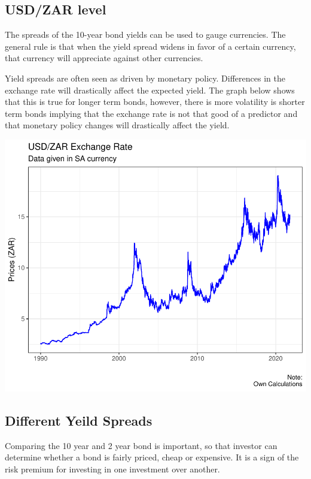 \documentclass[11pt,preprint, authoryear]{elsarticle}
\numberwithin{equation}{section}
\numberwithin{figure}{section}
\numberwithin{table}{section}
\begin{document}
\hypertarget{usdzar-level}{%
\subsection{USD/ZAR level}\label{usdzar-level}}

The spreads of the 10-year bond yields can be used to gauge currencies.
The general rule is that when the yield spread widens in favor of a
certain currency, that currency will appreciate against other
currencies.

Yield spreads are often seen as driven by monetary policy. Differences
in the exchange rate will drastically affect the expected yield. The
graph below shows that this is true for longer term bonds, however,
there is more volatility is shorter term bonds implying that the
exchange rate is not that good of a predictor and that monetary policy
changes will drastically affect the yield.

\includegraphics{Question1_files/figure-latex/unnamed-chunk-3-1.pdf}

\hypertarget{different-yeild-spreads}{%
\subsection{Different Yeild Spreads}\label{different-yeild-spreads}}

Comparing the 10 year and 2 year bond is important, so that investor can
determine whether a bond is fairly priced, cheap or expensive. It is a
sign of the risk premium for investing in one investment over another.
\end{document}
